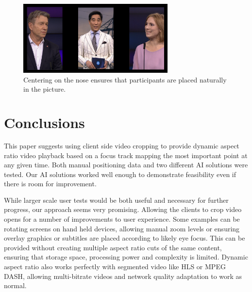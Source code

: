 \documentclass[sigconf, review=true]{acmart}
\begin{document}
\begin{figure}
\begin{center}
\includegraphics[width=0.7\textwidth]{nose_center.png}
\caption{Centering on the nose ensures that participants are placed naturally
 in the picture.}
\label{nose_center}
\end{center}
\end{figure}



\section{Conclusions}

This paper suggests using client side video cropping to provide dynamic aspect
ratio video playback based on a focus track mapping the most important point
at any given time. Both manual positioning data and two different AI
solutions were tested. Our AI solutions worked well enough to demonstrate
feasibility even if there is room for improvement.

While larger scale user tests would be both useful and necessary for further
progress, our approach seems very promising. Allowing the clients to crop
video opens for a number of improvements to user experience. Some examples
can be rotating screens on hand held devices, allowing manual zoom levels or
ensuring overlay graphics or subtitles are placed according to likely eye
focus. This can be provided without creating multiple aspect ratio cuts of
the same content, ensuring that storage space, processing power and
complexity is limited. Dynamic aspect ratio also works perfectly with
segmented video like HLS or MPEG DASH, allowing multi-bitrate videos and
network quality adaptation to work as normal. 
\end{document}
